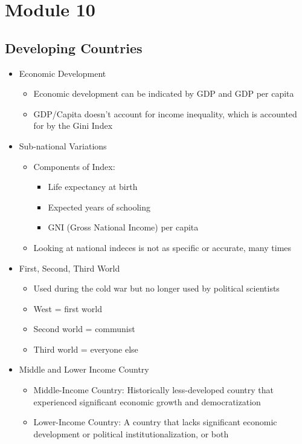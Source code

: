\documentclass[11pt]{article}
\author{Sudhan Chitgopkar}
\date{\today}
\title{}
\begin{document}
\tableofcontents

\section{Module 10}
\label{sec:org712d8be}
\subsection{Developing Countries}
\label{sec:org80bd050}
\begin{itemize}
\item Economic Development
\begin{itemize}
\item Economic development can be indicated by GDP and GDP per capita
\item GDP/Capita doesn't account for income inequality, which is accounted for by the Gini Index
\end{itemize}
\item Sub-national Variations
\begin{itemize}
\item Components of Index:
\begin{itemize}
\item Life expectancy at birth
\item Expected years of schooling
\item GNI (Gross National Income) per capita
\end{itemize}
\item Looking at national indeces is not as specific or accurate, many times
\end{itemize}
\item First, Second, Third World
\begin{itemize}
\item Used during the cold war but no longer used by political scientists
\item West = first world
\item Second world = communist
\item Third world = everyone else
\end{itemize}
\item Middle and Lower Income Country
\begin{itemize}
\item Middle-Income Country: Historically less-developed country that experienced significant economic growth and democratization
\item Lower-Income Country: A country that lacks significant economic development or political institutionalization, or both

\end{itemize}
\end{itemize}
\end{document}
